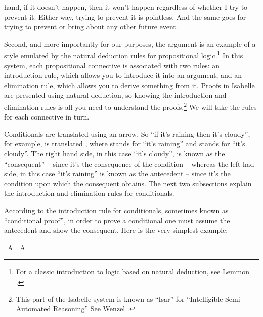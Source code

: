 \begin{isabellebody}
\begin{isamarkuptext}
hand, if it doesn't happen, then it won't happen regardless of whether I try to prevent it. Either
way, trying to prevent it is pointless. And the same goes for trying to prevent or bring about any
other future event.%
\end{isamarkuptext}\isamarkuptrue%
%
\begin{isamarkuptext}%
Second, and more importantly for our purposes, the argument is an example of a style emulated
by the natural deduction rules for propositional logic.\footnote{For a classic introduction to logic 
based on natural deduction, see Lemmon \cite{lemmon_beginning_1965}.} In this system, each propositional connective
is associated with two rules: an introduction rule, which allows you to introduce it into an argument, 
and an elimination rule, which allows you to derive something from it. Proofs in Isabelle are presented
using natural deduction, so knowing the introduction and elimination rules is all you need to understand
the proofs.\footnote{This part of the Isabelle system is known as ``Isar'' for ``Intelligible Semi-Automated Reasoning'' 
See Wenzel \cite{wenzel_isabelle/isarversatile_2002}.} We will take the rules for each connective in turn.%
\end{isamarkuptext}\isamarkuptrue%
%
\isamarkuptrue%
%
\begin{isamarkuptext}%
Conditionals are translated using an arrow. So ``if it's raining then it's cloudy'', for
example, is translated , where  stands for ``it's raining'' and 
stands for ``it's cloudy''. The right hand side, in this case ``it's cloudy'', is known as the
``consequent'' -- since it's the consequence of the condition -- whereas the left had side, in this
case ``it's raining'' is known as the antecedent -- since it's the condition upon which the consequent
obtains. The next two subsections explain the introduction and elimination rules for conditionals.%
\end{isamarkuptext}\isamarkuptrue%
%
\isamarkuptrue%
%
\begin{isamarkuptext}%
According to the introduction rule for conditionals, sometimes known as ``conditional proof'',
in order to prove a conditional one must assume the antecedent and show the consequent. Here is the
very simplest example:%
\end{isamarkuptext}\isamarkuptrue%
\isamarkupfalse%
\ {\isachardoublequoteopen}A\ {\isasymlongrightarrow}\ A{\isachardoublequoteclose}\isanewline

\end{isabellebody}
